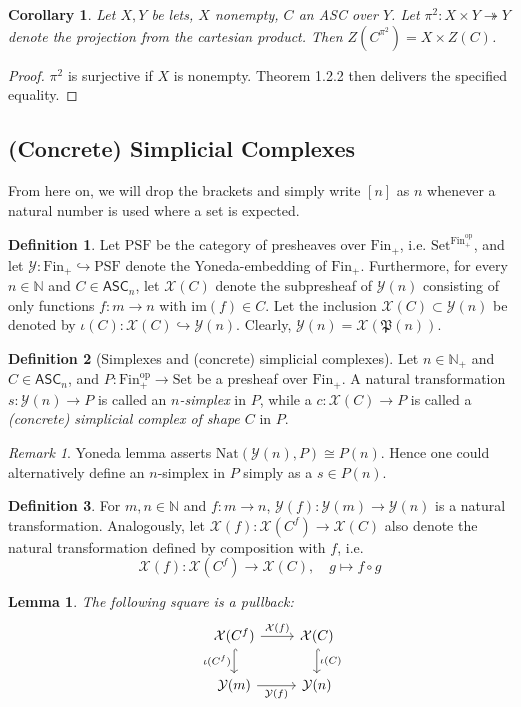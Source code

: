 \documentclass{article}
\newtheorem{lemma}{Lemma}[subsection]
\newtheorem{corollary}{Corollary}[subsection]
\theoremstyle{remark}
\newtheorem{remark}{Remark}[subsection]
\theoremstyle{definition}
\newtheorem{definition}{Definition}[subsection]
\newcommand{\N}{\mathbb N}
\newcommand{\Fin}{\mathrm{Fin}}
\newcommand{\Set}{\mathrm{Set}}
\newcommand{\PSF}{\mathrm{PSF}}
\newcommand{\op}{\mathrm{op}}
\newcommand{\p}{\mathfrak P}
\newcommand{\ASC}{\mathsf{ASC}}
\newcommand{\im}{\mathrm{im}}
\newcommand{\Y}{\mathcal Y}
\newcommand{\X}{\mathcal X}
\newcommand{\Nat}{\mathrm{Nat}}
\begin{document}
	\begin{corollary}\label{centerpi}
		Let $X,Y$ be lets, $X$ nonempty, $C$ an ASC over $Y$. Let $\pi^2:X\times Y\twoheadrightarrow Y$ denote the projection from the cartesian product. Then $Z\left(C^{\pi^2}\right)=X\times Z(C)$.
	\end{corollary}
	\begin{proof}
		$\pi^2$ is surjective if $X$ is nonempty. Theorem 1.2.2 then delivers the specified equality.
	\end{proof}
	\subsection{(Concrete) Simplicial Complexes}
	From here on, we will drop the brackets and simply write $[n]$ as $n$ whenever a natural number is used where a set is expected.
	\begin{definition}
		Let $\PSF$ be the category of presheaves over $\Fin_+$, i.e. $\Set^{\Fin_+^\op}$, and let $\Y:\Fin_+\hookrightarrow\PSF$ denote the Yoneda-embedding of $\Fin_+$. Furthermore, for every $n\in\N$ and $C\in\ASC_n$, let $\X(C)$ denote the subpresheaf of $\Y(n)$ consisting of only functions $f:m\to n$ with $\im(f)\in C$. Let the inclusion $\X(C)\subset\Y(n)$ be denoted by $\iota(C):\X(C)\hookrightarrow\Y(n)$. Clearly, $\Y(n)=\X(\p(n))$.
	\end{definition}
	\begin{definition}[Simplexes and (concrete) simplicial complexes]
		Let $n\in\N_+$ and $C\in\ASC_n$, and $P:\Fin_+^\op\to\Set$ be a presheaf over $\Fin_+$. A natural transformation $s:\Y(n)\to P$ is called an \textit{$n$-simplex} in $P$, while a $c:\X(C)\to P$ is called a \textit{(concrete) simplicial complex of shape $C$} in $P$.
	\end{definition}
	\begin{remark}
		Yoneda lemma asserts $\Nat(\Y(n),P)\cong P(n)$. Hence one could alternatively define an $n$-simplex in $P$ simply as a $s\in P(n)$.
	\end{remark}
	\begin{definition}
		For $m,n\in\N$ and $f:m\to n$, $\Y(f):\Y(m)\to\Y(n)$ is a natural transformation. Analogously, let $\X(f):\X(C^f)\to\X(C)$ also denote the natural transformation defined by composition with $f$, i.e.
		\[\X(f):\X(C^f)\to\X(C),\quad g\mapsto f\circ g\]
	\end{definition}
	\begin{lemma}
		The following square is a pullback:
		\[\begin{tikzcd}
			&\X(C^f)\arrow{r}{\X(f)}\arrow[hook]{d}[swap]{\iota(C^f)}&\X(C)\arrow[hook]{d}{\iota(C)}\\
			&\Y(m)\arrow{r}[swap]{\Y(f)}&\Y(n)
		\end{tikzcd}\]
	\end{lemma}
\end{document}
